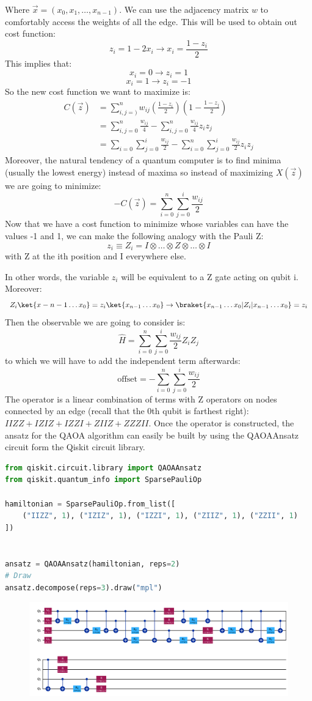 \documentclass[12pt, oneside]{book}
\theoremstyle{definition}
\theoremstyle{definition}
\theoremstyle{remark}
\begin{document}
Where $\vec{x}=(x_0,x_1,\ldots,x_{n-1})$. We can use the adjacency matrix $w$ to comfortably access the weights of all the edge. This will be used to obtain out cost function:
\[
    z_i=1-2x_i\rightarrow x_i=\frac{1-z_i}{2}
\]
This implies that:
\[
x_i=0\rightarrow z_i=1
\]
\[
x_i=1\rightarrow z_i=-1
\]
So the new cost function we want to maximize is:
\begin{align*}
C(\vec{z})&=\sum_{i,j=)}^n w_{ij}\left(\frac{1-z_i}{2}\right) \left(1-\frac{1-z_j}{2}\right)\\
&=\sum_{i,j=0}^n \frac{w_{ij}}{4} - \sum_{i,j=0}^n \frac{w_{ij}}{4}z_iz_j\\
&=\sum_{i=0}\sum_{j=0}^i \frac{w_{ij}}{2} - \sum_{i=0}^n\sum_{j=0}^i \frac{w_{ij}}{2}z_iz_j
\end{align*}
Moreover, the natural tendency of a quantum computer is to find minima (usually the lowest energy) instead of maxima so instead of maximizing $X(\vec{z})$ we are going to minimize:
\[
-C(\vec{z})=\sum_{i=0}^n\sum_{j=0}^i \frac{w_{ij}}{2}
\]
Now that we have a cost function to minimize whose variables can have the values -1 and 1, we can make the following analogy with the Pauli Z:
\[
z_i\equiv Z_i=I\otimes \ldots \otimes Z \otimes \ldots \otimes I
\]
with Z at the ith position and I everywhere else.

In other words, the variable $z_i$ will be equivalent to a Z gate acting on qubit i. Moreover:
\[
Z_i\ket{x-{n-1}\ldots x_0}=z_i\ket{x_{n-1}\ldots x_0}\rightarrow \braket{x_{n-1}\ldots x_0|Z_i|x_{n-1}\ldots x_0}=z_i
\]
Then the observable we are going to consider is:
\[
\hat{H}=\sum_{i=0}^n \sum_{j=0}^i \frac{w_{ij}}{2} Z_iZ_j
\]
to which we will have to add the independent term afterwards:
\[
\text{offset}=-\sum_{i=0}^n\sum_{j=0}^i \frac{w_{ij}}{2}
\]
The operator is a linear combination of terms with Z operators on nodes connected by an edge (recall that the 0th qubit is farthest right): $IIZZ+IZIZ+IZZI+ZIIZ+ZZZII$. Once the operator is constructed, the ansatz for the QAOA algorithm can easily be built by using the QAOAAnsatz circuit form the Qiskit circuit library.
\begin{lstlisting}[language=Python]
from qiskit.circuit.library import QAOAAnsatz
from qiskit.quantum_info import SparsePauliOp

hamiltonian = SparsePauliOp.from_list([
    ("IIZZ", 1), ("IZIZ", 1), ("IZZI", 1), ("ZIIZ", 1), ("ZZII", 1)
])


ansatz = QAOAAnsatz(hamiltonian, reps=2)
# Draw
ansatz.decompose(reps=3).draw("mpl")
\end{lstlisting}
\begin{figure}[H]
    \centering
    \includegraphics[width=0.75\linewidth]{../images/circ_exp.png}
\end{figure}
\end{document}
